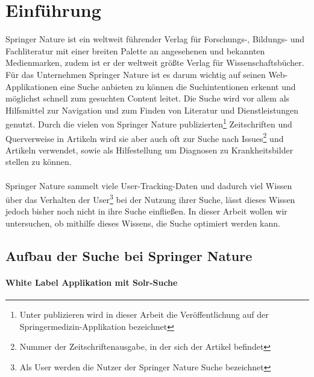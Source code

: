 %
\chapter{Einführung}
\label{sec:Einfuehrung}

Springer Nature ist ein weltweit führender Verlag für Forschungs-, Bildungs- und Fachliteratur mit einer breiten Palette an angesehenen und bekannten Medienmarken, zudem ist er der weltweit größte Verlag für Wissenschaftsbücher. Für das Unternehmen Springer Nature ist es darum wichtig auf seinen Web-Applikationen eine Suche anbieten zu können die Suchintentionen erkennt und möglichst schnell zum gesuchten Content leitet. Die Suche wird vor allem als Hilfsmittel zur Navigation und zum Finden von Literatur und Dienstleistungen genutzt. Durch die vielen von Springer Nature publizierten\footnote{Unter publizieren wird in dieser Arbeit die Veröffentlichung auf der Springermedizin-Applikation bezeichnet} Zeitschriften und Querverweise in Artikeln wird sie aber auch oft zur Suche nach Issues\footnote{Nummer der Zeitschriftenausgabe, in der sich der Artikel befindet} und Artikeln verwendet, sowie als Hilfestellung um Diagnosen zu Krankheitsbilder stellen zu können.
\\
\\
Springer Nature sammelt viele User-Tracking-Daten und dadurch viel Wissen über das Verhalten der User\footnote{Als User werden die Nutzer der Springer Nature Suche bezeichnet} bei der Nutzung ihrer Suche, lässt dieses Wissen jedoch bisher noch nicht in ihre Suche einfließen. In dieser Arbeit wollen wir untersuchen, ob mithilfe dieses Wissens, die Suche optimiert werden kann.


\section{Aufbau der Suche bei Springer Nature}
\label{sec:Einfuehrung:AufbauSucheBeiSpringerNature}

\subsubsection{White Label Applikation mit Solr-Suche}
\label{sec:Einfuehrung:AufbauSucheBeiSpringerNature:WhiteLabelApplikationSolr-Suche}

